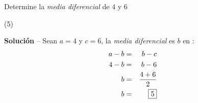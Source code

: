 \item{Determine la \textit{media diferencial} de $4$ y $6$
	\begin{tasks}(5)
	\end{tasks}
	\noindent \textbf{Solución} -- {\small Sean $a = 4$ y $c = 6$, la \textit{media diferencial} es $b$ en} :
	\begin{eqnarray*}
		a - b &=& b - c \\
		4 - b &=& b - 6 \\
		b &=& \dfrac{4 + 6}{2} \\
		b &=& \fbox{5}
	\end{eqnarray*}
}


